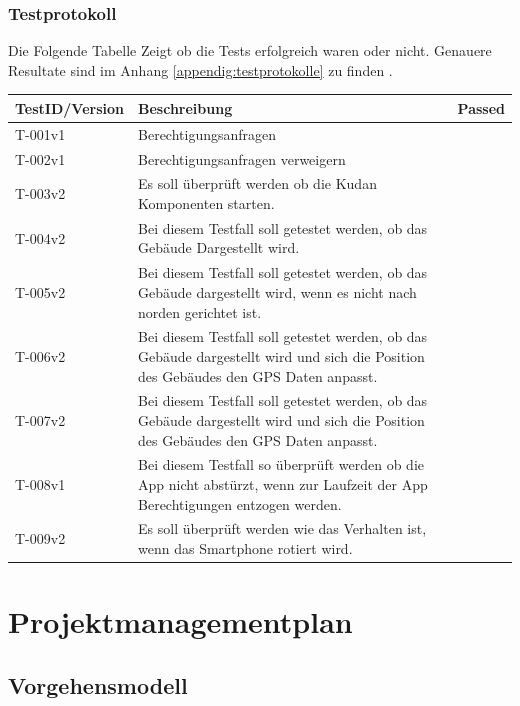 \documentclass[a4paper]{scrreprt}
\begin{document}
\subsection{Testprotokoll}
\label{ch:testprotokoll}
Die Folgende Tabelle Zeigt ob die Tests erfolgreich waren oder nicht. Genauere Resultate sind im Anhang \ref{appendig:testprotokolle} zu finden . 
\bigbreak

\begin{tabularx}{\textwidth}{|l|X|l|}
\hline
	\textbf{TestID/Version }& \textbf{Beschreibung} & \textbf{Passed} \\
\hline
	T-001v1 & Berechtigungsanfragen & \checkmark \\
\hline
	T-002v1 & Berechtigungsanfragen verweigern & \checkmark \\
\hline
	T-003v2 & Es soll überprüft werden ob die Kudan Komponenten starten. & \checkmark \\
\hline
	T-004v2 & Bei diesem Testfall soll getestet werden, ob das Gebäude Dargestellt wird. & \checkmark \\
\hline
	T-005v2 & Bei diesem Testfall soll getestet werden, ob das Gebäude dargestellt wird, wenn es nicht nach norden gerichtet ist. & \checkmark \\
\hline
	T-006v2 & Bei diesem Testfall soll getestet werden, ob das Gebäude dargestellt wird und sich die Position des Gebäudes den GPS Daten anpasst. & \checkmark \\
\hline
	T-007v2 & Bei diesem Testfall soll getestet werden, ob das Gebäude dargestellt wird und sich die Position des Gebäudes den GPS Daten anpasst. & \checkmark \\
\hline
	T-008v1 & Bei diesem Testfall so überprüft werden ob die App nicht abstürzt, wenn zur Laufzeit der App Berechtigungen entzogen werden. & \checkmark \\
\hline
	T-009v2 & Es soll überprüft werden wie das Verhalten ist, wenn das Smartphone rotiert wird. & \checkmark \\
\hline
\end{tabularx}

\chapter{Projektmanagementplan}

\section{Vorgehensmodell}
\end{document}
